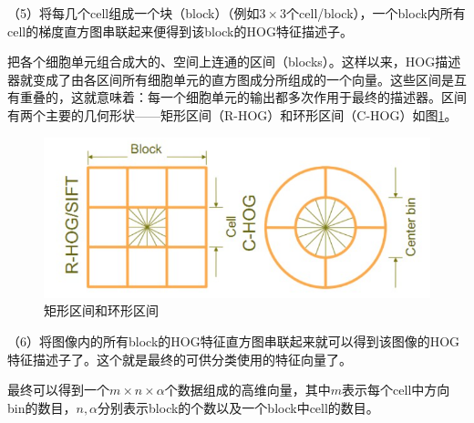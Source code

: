 \documentclass[12pt]{article}
\begin{document}
（5）将每几个cell组成一个块（block）（例如$3 \times 3 $个cell/block），一个block内所有cell的梯度直方图串联起来便得到该block的HOG特征描述子。
    
    把各个细胞单元组合成大的、空间上连通的区间（blocks）。这样以来，HOG描述器就变成了由各区间所有细胞单元的直方图成分所组成的一个向量。这些区间是互有重叠的，这就意味着：每一个细胞单元的输出都多次作用于最终的描述器。区间有两个主要的几何形状——矩形区间（R-HOG）和环形区间（C-HOG）如图\ref{fig:shape}。
        \begin{figure}
            \centering
            \includegraphics[width=0.5\linewidth]{shape}
            \caption{矩形区间和环形区间}
            \label{fig:shape}
        \end{figure}
        
（6）将图像内的所有block的HOG特征直方图串联起来就可以得到该图像的HOG特征描述子了。这个就是最终的可供分类使用的特征向量了。

    最终可以得到一个$m \times n \times \alpha$个数据组成的高维向量，其中$m$表示每个cell中方向bin的数目，$n,\alpha$分别表示block的个数以及一个block中cell的数目。
\end{document}
